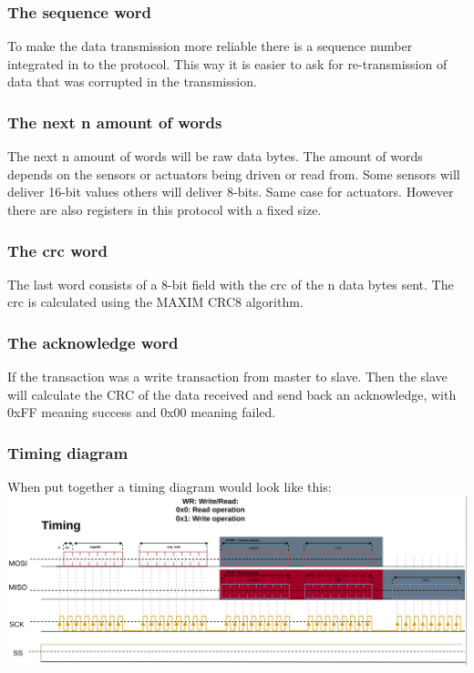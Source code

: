 \subsubsection{The sequence word}
To make the data transmission more reliable there is a sequence number integrated in to the protocol. This way it is easier to ask for re-transmission of data that was corrupted in the transmission.

\subsubsection{The next n amount of words}
The next n amount of words will be raw data bytes. The amount of words depends on the sensors or actuators being driven or read from. Some sensors will deliver 16-bit values others will deliver 8-bits. Same case for actuators. However there are also registers in this protocol with a fixed size.

\subsubsection{The crc word}
The last word consists of a 8-bit field with the crc of the n data bytes sent. The crc is calculated using the MAXIM CRC8 algorithm.

\subsubsection{The acknowledge word}
If the transaction was a write transaction from master to slave. Then the slave will calculate the CRC of the data received and send back an acknowledge, with 0xFF meaning success and 0x00 meaning failed.

\pagebreak
\subsubsection{Timing diagram}
When put together a timing diagram would look like this:\\
\includegraphics[scale=0.28]{figures/mainboard_communication_timing_diagram.png}
\pagebreak
